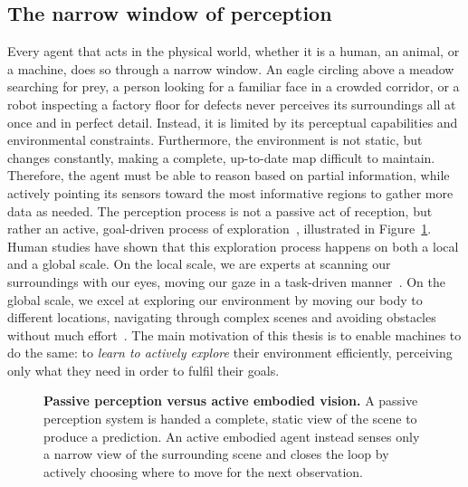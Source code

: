 \subsection{The narrow window of perception}

Every agent that acts in the physical world, whether it is a human, an animal, or a machine, does so through a narrow window.
An eagle circling above a meadow searching for prey, a person looking for a familiar face in a crowded corridor, or a robot inspecting a factory floor for defects
never perceives its surroundings all at once and in perfect detail. Instead, it is limited by its perceptual capabilities and environmental constraints. Furthermore,
the environment is not static, but changes constantly, making a complete, up-to-date map difficult to maintain.
Therefore, the agent must be able to reason based on partial information, while actively pointing its sensors toward the most informative regions to gather more data as needed.
The perception process is not a passive act of reception, but rather an active, goal-driven process of exploration~\cite{bajcsy1988active,aloimonos1988active,ballard1991animate}, illustrated in Figure~\ref{fig:passive-active}.
Human studies have shown that this exploration process happens on both a local and a global scale.
On the local scale, we are experts at scanning our surroundings with our eyes, moving our gaze in a task-driven manner~\cite{yarbus1967eye,hayhoe2005eye}.
On the global scale, we excel at exploring our environment by moving our body to different locations, navigating through complex scenes and avoiding obstacles without much effort~\cite{fajen2003behavioral}.
The main motivation of this thesis is to enable machines to do the same: to \emph{learn to actively explore} their environment efficiently, perceiving only what they need in order to fulfil their goals.

\begin{figure}[th]
\centering

\caption[Passive perception versus active embodied vision]{\textbf{Passive perception versus active embodied vision.} A passive perception system is handed a complete, static view of the scene to produce a prediction. An active embodied agent instead senses only a narrow view of the surrounding scene and closes the loop by actively choosing where to move for the next observation.}
\label{fig:passive-active}
\end{figure}

